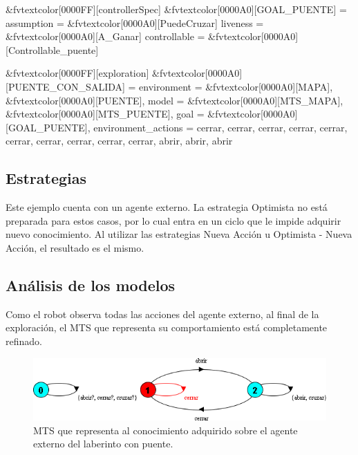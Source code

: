 \begin{Code}[commandchars=&\[\]]
&fvtextcolor[0000FF][controllerSpec] &fvtextcolor[0000A0][GOAL_PUENTE] = {
    assumption   = {&fvtextcolor[0000A0][PuedeCruzar]}
    liveness     = {&fvtextcolor[0000A0][A_Ganar]}
    controllable = {&fvtextcolor[0000A0][Controllable_puente]}
}

&fvtextcolor[0000FF][exploration] &fvtextcolor[0000A0][PUENTE_CON_SALIDA] = {
    environment         = {&fvtextcolor[0000A0][MAPA], &fvtextcolor[0000A0][PUENTE]},
    model               = {&fvtextcolor[0000A0][MTS_MAPA], &fvtextcolor[0000A0][MTS_PUENTE]},
    goal                = {&fvtextcolor[0000A0][GOAL_PUENTE]},
    environment_actions = {{cerrar, cerrar, cerrar, cerrar, cerrar,
                            cerrar, cerrar, cerrar, cerrar, cerrar, 
                            abrir, abrir, abrir}}
}
\end{Code}

\clearpage

\subsection{Estrategias}

Este ejemplo cuenta con un agente externo. La estrategia Optimista no está preparada para estos casos, por lo cual entra en un ciclo que le impide adquirir
nuevo conocimiento. Al utilizar las estrategias Nueva Acción u Optimista - Nueva Acción, el resultado es el mismo.

\subsection{Análisis de los modelos}

Como el robot observa todas las acciones del agente externo, al final de la exploración, el MTS que representa su comportamiento está completamente refinado.

\begin{figure}[H]
	\centering
		\includegraphics[width=1.0\textwidth]{Imagenes/Laberintos/puente_modelo_puente.png}
	\caption{MTS que representa al conocimiento adquirido sobre el agente externo del laberinto con puente.}
	\label{fig:puente_modelo_puente}
\end{figure}


